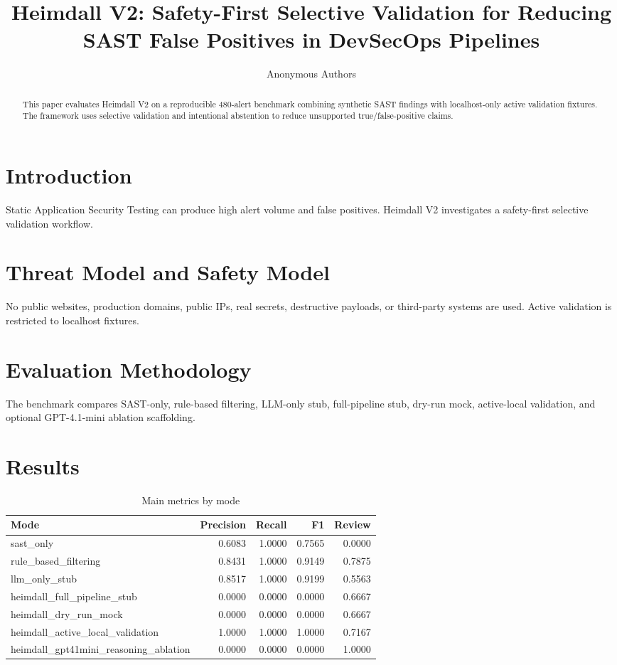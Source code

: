 \documentclass[conference]{IEEEtran}
\title{Heimdall V2: Safety-First Selective Validation for Reducing SAST False Positives in DevSecOps Pipelines}
\author{Anonymous Authors}
\begin{document}
\maketitle
\begin{abstract}
This paper evaluates Heimdall V2 on a reproducible 480-alert benchmark combining synthetic SAST findings with localhost-only active validation fixtures. The framework uses selective validation and intentional abstention to reduce unsupported true/false-positive claims.
\end{abstract}
\section{Introduction}
Static Application Security Testing can produce high alert volume and false positives. Heimdall V2 investigates a safety-first selective validation workflow.
\section{Threat Model and Safety Model}
No public websites, production domains, public IPs, real secrets, destructive payloads, or third-party systems are used. Active validation is restricted to localhost fixtures.
\section{Evaluation Methodology}
The benchmark compares SAST-only, rule-based filtering, LLM-only stub, full-pipeline stub, dry-run mock, active-local validation, and optional GPT-4.1-mini ablation scaffolding.
\section{Results}
\begin{table}[h]
\centering
\caption{Main metrics by mode}
\begin{tabular}{lrrrr}
\toprule
Mode & Precision & Recall & F1 & Review \\
\midrule
sast\_only & 0.6083 & 1.0000 & 0.7565 & 0.0000 \\
rule\_based\_filtering & 0.8431 & 1.0000 & 0.9149 & 0.7875 \\
llm\_only\_stub & 0.8517 & 1.0000 & 0.9199 & 0.5563 \\
heimdall\_full\_pipeline\_stub & 0.0000 & 0.0000 & 0.0000 & 0.6667 \\
heimdall\_dry\_run\_mock & 0.0000 & 0.0000 & 0.0000 & 0.6667 \\
heimdall\_active\_local\_validation & 1.0000 & 1.0000 & 1.0000 & 0.7167 \\
heimdall\_gpt41mini\_reasoning\_ablation & 0.0000 & 0.0000 & 0.0000 & 1.0000 \\
\bottomrule
\end{tabular}
\end{table}
\end{document}
